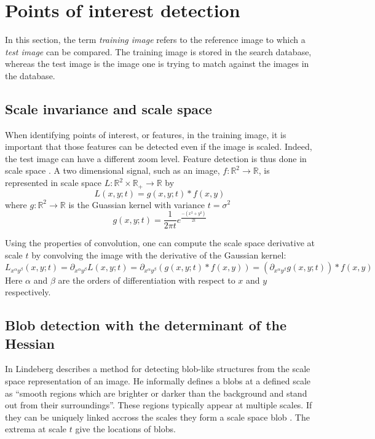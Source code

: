 \section{Points of interest detection}

In this section, the term \emph{training image} refers to the reference image to which a \emph{test image} can be compared. The training image is stored in the search database, whereas the test image is the image one is trying to match against the images in the database.

\subsection{Scale invariance and scale space}

When identifying points of interest, or features, in the training image, it is important that those features can be detected even if the image is scaled. Indeed, the test image can have a different zoom level. Feature detection is thus done in scale space \cite{Lindeberg98featuredetection}. A two dimensional signal, such as an image, $f: \mathbb{R}^2 \to \mathbb{R}$, is represented in scale space $L: \mathbb{R}^2 \times \mathbb{R}_+ \to \mathbb{R}$ by
\begin{equation}
L(x,y;t) = g(x,y;t) \ast f(x,y)
\end{equation}
where $g: \mathbb{R}^2 \to \mathbb{R}$ is the Guassian kernel with variance $t=\sigma^2$
\begin{equation}
g(x,y;t) = \frac{1}{2 \pi t} e ^ \frac{-(x^2+y^2)}{2t}
\end{equation}

Using the properties of convolution, one can compute the scale space derivative at scale $t$ by convolving the image with the derivative of the Gaussian kernel:
\begin{equation}
    L_{x^\alpha y^\beta} (x,y;t) = \partial _{x^\alpha y^\beta} L(x,y;t) = \partial _{x^\alpha y^\beta} (g(x,y;t) \ast f(x,y)) = (\partial _{x^\alpha y^\beta} g(x,y;t)) \ast f(x,y)
\end{equation}
Here $\alpha$ and $\beta$ are the orders of differentiation with respect to $x$ and $y$ respectively.

\subsection{Blob detection with the determinant of the Hessian}

In \cite{Lindeberg93detectingsalient} Lindeberg describes a method for detecting blob-like structures from the scale space representation of an image. He informally defines a blobs at a defined scale as ``smooth regions which are brighter or darker than the background and stand out from their surroundings''. These regions typically appear at multiple scales. If they can be uniquely linked accross the scales they form a scale space blob \cite{Lindeberg93detectingsalient}. The extrema at scale $t$ give the locations of blobs.

